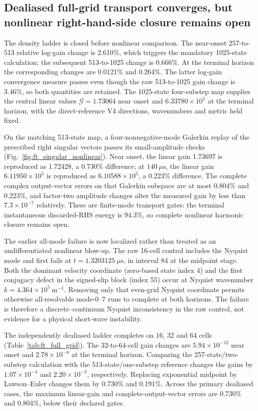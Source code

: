 \subsection{Dealiased full-grid transport converges, but nonlinear right-hand-side closure remains open}

The density ladder is closed before nonlinear comparison.  The near-onset
257-to-513 relative log-gain change is 2.610\%, which triggers the mandatory
1025-state calculation; the subsequent 513-to-1025 change is 0.666\%.
At the terminal horizon the corresponding changes are 0.0121\% and 0.264\%.
The latter log-gain convergence measure passes even though the raw
513-to-1025 gain change is 3.46\%, so both quantities are retained.  The
1025-state four-substep map supplies the central linear values
$\mathcal G=1.73064$ near onset and $6.33780\times10^5$ at the terminal
horizon, with the direct-reference V4 directions, wavenumbers and metric held
fixed.

On the matching 513-state map, a four-nonnegative-mode Galerkin replay of the
prescribed right singular vectors passes its small-amplitude checks
(Fig.~\ref{fig:ft_singular_nonlinear}).  Near onset, the linear gain 1.73697 is
reproduced as 1.72428, a 0.730\% difference; at $140~\mu\mathrm s$, the linear
gain $6.11950\times10^5$ is reproduced as $6.10588\times10^5$, a 0.223\%
difference.  The complete complex output-vector errors on that Galerkin
subspace are at most 0.804\% and 0.223\%, and factor-two amplitude changes alter
the measured gain by less than $7.3\times10^{-7}$ relatively.  These are
finite-mode transport gates: the terminal instantaneous discarded-RHS energy
is 94.3\%, so complete nonlinear harmonic closure remains open.

The earlier all-mode failure is now localized rather than treated as an
undifferentiated nonlinear blow-up.  The raw 16-cell control includes the
Nyquist mode and first fails at $t=1.3203125~\mu\mathrm s$, in interval 84 at
the midpoint stage.  Both the dominant velocity coordinate (zero-based state
index 4) and the first conjugacy defect in the signed-slip block (index 55)
occur at Nyquist wavenumber $k=4.364\times10^5~\mathrm{m^{-1}}$.  Removing
only that even-grid Nyquist coordinate permits otherwise all-resolvable
mode-0--7 runs to complete at both horizons.  The failure is therefore a
discrete--continuum Nyquist inconsistency in the raw control, not evidence for
a physical short-wave instability.

The independently dealiased ladder completes on 16, 32 and 64 cells
(Table~\ref{tab:ft_full_grid}).  The 32-to-64-cell gain changes are
$5.94\times10^{-12}$ near onset and $2.78\times10^{-8}$ at the terminal
horizon.  Comparing the 257-state/two-substep calculation with the
513-state/one-substep reference changes the gains by $1.07\times10^{-4}$ and
$2.20\times10^{-3}$, respectively.  Replacing exponential midpoint by
Lawson--Euler changes them by 0.730\% and 0.191\%.  Across the primary
dealiased cases, the maximum linear-gain and complete-output-vector errors are
0.730\% and 0.804\%, below their declared gates.

